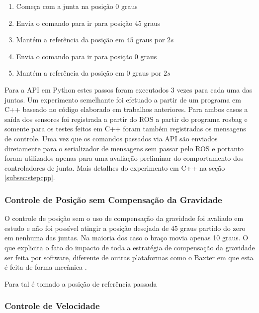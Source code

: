 \begin{enumerate}
    \item Começa com a junta na posição $0$ graus
    \item Envia o comando para ir para posição $45$ graus
    \item Mantém a referência da posição em $45$ graus por $2s$
    \item Envia o comando para ir para posição $0$ graus
    \item Mantém a referência da posição em $0$ graus por $2s$
\end{enumerate}

Para a API em Python estes passos foram executados 3 vezes para cada uma das juntas. Um experimento semelhante foi efetuado a partir de um programa em C++ baseado no código elaborado em trabalhos anteriores. Para ambos casos a saída dos sensores foi registrada a partir do ROS a partir do programa rosbag e somente para os testes feitos em C++ foram também registradas os mensagens de controle. Uma vez que os comandos passados via API são enviados diretamente para o serializador de mensagens sem passar pelo ROS e portanto foram utilizados apenas para uma avaliação preliminar do comportamento dos controladores de junta. Mais detalhes do experimento em C++ na seção \ref{subsec:stepcpp}. 


\subsubsection{Controle de Posição sem Compensação da Gravidade}

O controle de posição sem o uso de compensação da gravidade foi avaliado em estudo e não foi possível atingir a posição desejada de 45 graus partido do zero em nenhuma das juntas. Na maioria dos caso o braço movia apenas 10 graus. O que explicita o fato do impacto de toda a estratégia de compensação da gravidade ser feita por software, diferente de outras plataformas como o Baxter em que esta é feita de forma mecânica \cite{nobody}.

Para tal é tomado a posição de referência passada

\subsubsection{Controle de Velocidade}

